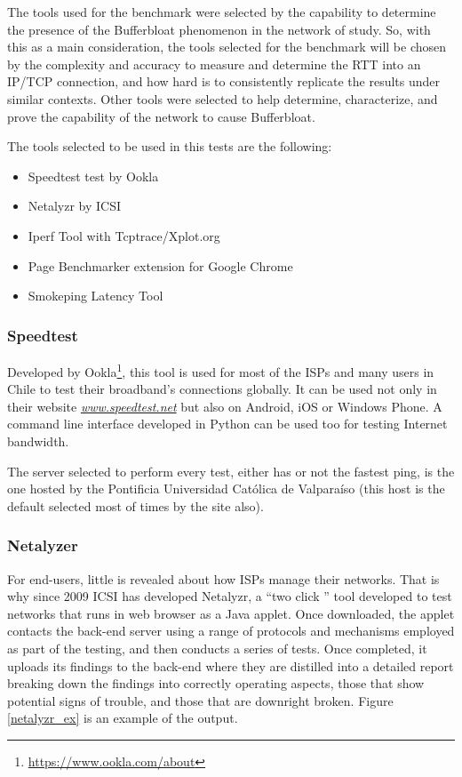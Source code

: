 The tools used for the benchmark were selected by the capability to
determine  the presence of the Bufferbloat phenomenon in the network of
study. So, with this as a main consideration, the
tools selected for  the benchmark will be chosen by the complexity and
accuracy to measure and  determine the RTT into an IP/TCP connection, and how
hard is to consistently  replicate the results under similar contexts. Other
tools were selected to help  determine, characterize, and prove the capability
of the network to cause  Bufferbloat.

\newpage 

The tools selected to be used in this tests are the following:

\begin{itemize}
    \item Speedtest test by Ookla
    \item Netalyzr by ICSI
    \item Iperf Tool with Tcptrace/Xplot.org
    \item Page Benchmarker extension for Google Chrome
    \item Smokeping Latency Tool
\end{itemize}

\subsubsection{Speedtest}

Developed by Ookla\footnote{\url{https://www.ookla.com/about}}, this tool is used
for most of the ISPs and many users in Chile to test their broadband's
connections globally. It can be used not only in their website 
\href{http://www.speedtest.net}{\emph{www.speedtest.net}} but also on Android,
iOS or Windows Phone. A command line interface developed in Python can be used 
too for testing Internet bandwidth.

The server selected to perform every test, either has or not the
fastest ping, is the one hosted by the Pontificia Universidad Cat\'olica de
Valpara\'iso (this host is the default selected most of times by the site also).  

\subsubsection{Netalyzer}

For end-users, little is revealed about how ISPs manage their networks. That is
why since 2009 ICSI has developed Netalyzr, a ``two click '' tool developed to
test networks that runs in web browser as a Java applet. Once downloaded, the
applet contacts the back-end server using a range of protocols and mechanisms
employed as part of the testing, and then conducts a series of tests. Once
completed, it uploads its findings to the back-end where they are distilled
into a detailed report breaking down the findings into correctly operating
aspects, those that show potential signs of trouble, and those that are
downright broken. Figure \ref{netalyzr_ex} is an example of the output.

